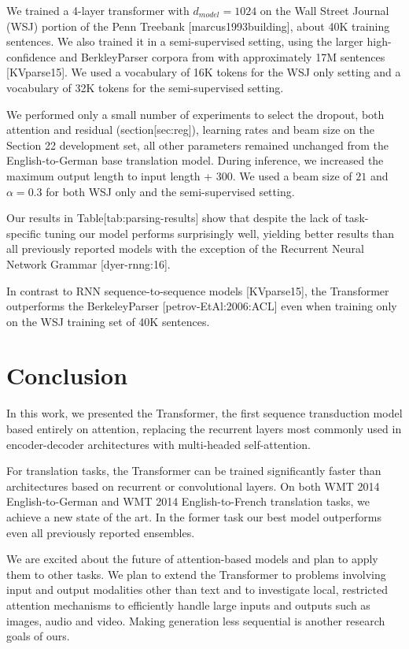 \documentclass[11pt,a4paper]{article}
\begin{document}
We trained a 4-layer transformer with $d_{model} = 1024$ on the Wall Street Journal (WSJ) portion of the Penn Treebank [marcus1993building], about 40K training sentences. We also trained it in a semi-supervised setting, using the larger high-confidence and BerkleyParser corpora from with approximately 17M sentences [KVparse15]. We used a vocabulary of 16K tokens for the WSJ only setting and a vocabulary of 32K tokens for the semi-supervised setting.

We performed only a small number of experiments to select the dropout, both attention and residual (section[sec:reg]), learning rates and beam size on the Section 22 development set, all other parameters remained unchanged from the English-to-German base translation model. During inference, we increased the maximum output length to input length + $300$. We used a beam size of $21$ and $\alpha=0.3$ for both WSJ only and the semi-supervised setting.

Our results in Table[tab:parsing-results] show that despite the lack of task-specific tuning our model performs surprisingly well, yielding better results than all previously reported models with the exception of the Recurrent Neural Network Grammar [dyer-rnng:16].

In contrast to RNN sequence-to-sequence models [KVparse15], the Transformer outperforms the BerkeleyParser [petrov-EtAl:2006:ACL] even when training only on the WSJ training set of 40K sentences.

\section{Conclusion}

In this work, we presented the Transformer, the first sequence transduction model based entirely on attention, replacing the recurrent layers most commonly used in encoder-decoder architectures with multi-headed self-attention.

For translation tasks, the Transformer can be trained significantly faster than architectures based on recurrent or convolutional layers. On both WMT 2014 English-to-German and WMT 2014 English-to-French translation tasks, we achieve a new state of the art. In the former task our best model outperforms even all previously reported ensembles.

We are excited about the future of attention-based models and plan to apply them to other tasks. We plan to extend the Transformer to problems involving input and output modalities other than text and to investigate local, restricted attention mechanisms to efficiently handle large inputs and outputs such as images, audio and video. Making generation less sequential is another research goals of ours.
\end{document}
